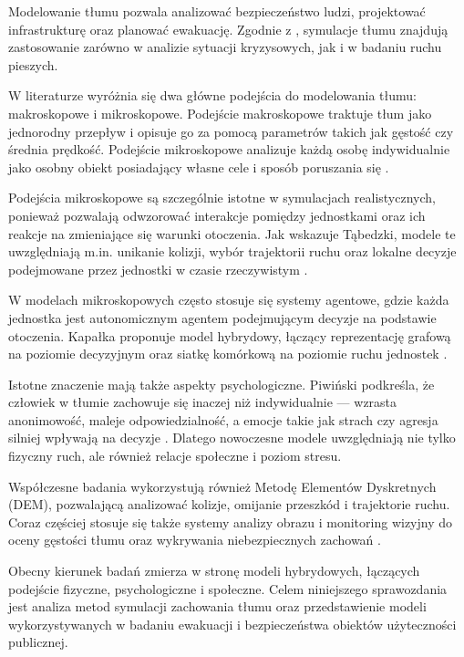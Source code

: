 \documentclass[polish]{projectreport}
\begin{document}
Modelowanie tłumu pozwala analizować bezpieczeństwo ludzi, projektować infrastrukturę oraz planować ewakuację. Zgodnie z \cite{kapalka2011symulacja}, symulacje tłumu znajdują zastosowanie zarówno w analizie sytuacji kryzysowych, jak i w badaniu ruchu pieszych.

W literaturze wyróżnia się dwa główne podejścia do modelowania tłumu: makroskopowe i mikroskopowe. Podejście makroskopowe traktuje tłum jako jednorodny przepływ i opisuje go za pomocą parametrów takich jak gęstość czy średnia prędkość. Podejście mikroskopowe analizuje każdą osobę indywidualnie jako osobny obiekt posiadający własne cele i sposób poruszania się \cite{piwinski2010modelowanie}.

Podejścia mikroskopowe są szczególnie istotne w symulacjach realistycznych, ponieważ pozwalają odwzorować interakcje pomiędzy jednostkami oraz ich reakcje na zmieniające się warunki otoczenia. Jak wskazuje Tąbedzki, modele te uwzględniają m.in. unikanie kolizji, wybór trajektorii ruchu oraz lokalne decyzje podejmowane przez jednostki w czasie rzeczywistym \cite{tabedzki2013mikroskopowe}.

W modelach mikroskopowych często stosuje się systemy agentowe, gdzie każda jednostka jest autonomicznym agentem podejmującym decyzje na podstawie otoczenia. Kapałka proponuje model hybrydowy, łączący reprezentację grafową na poziomie decyzyjnym oraz siatkę komórkową na poziomie ruchu jednostek \cite{kapalka2011symulacja}.

Istotne znaczenie mają także aspekty psychologiczne. Piwiński podkreśla, że człowiek w tłumie zachowuje się inaczej niż indywidualnie --- wzrasta anonimowość, maleje odpowiedzialność, a emocje takie jak strach czy agresja silniej wpływają na decyzje \cite{piwinski2010modelowanie}. Dlatego nowoczesne modele uwzględniają nie tylko fizyczny ruch, ale również relacje społeczne i poziom stresu.

Współczesne badania wykorzystują również Metodę Elementów Dyskretnych (DEM), pozwalającą analizować kolizje, omijanie przeszkód i trajektorie ruchu. Coraz częściej stosuje się także systemy analizy obrazu i monitoring wizyjny do oceny gęstości tłumu oraz wykrywania niebezpiecznych zachowań \cite{piwinski2010modelowanie}.

Obecny kierunek badań zmierza w stronę modeli hybrydowych, łączących podejście fizyczne, psychologiczne i społeczne. Celem niniejszego sprawozdania jest analiza metod symulacji zachowania tłumu oraz przedstawienie modeli wykorzystywanych w badaniu ewakuacji i bezpieczeństwa obiektów użyteczności publicznej.
\end{document}
